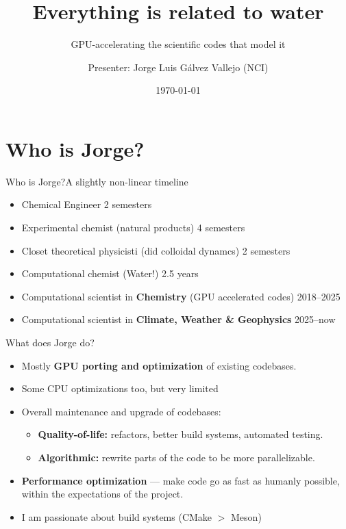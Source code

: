 \documentclass[aspectratio=169]{beamer}
\title[Water on GPUs]{Everything is related to water}
\subtitle{GPU-accelerating the scientific codes that model it}
\author[NOAA-GFDL \textperiodcentered\ ACCESS-NRI \textperiodcentered\ NCI]{Presenter: Jorge Luis Gálvez Vallejo \textnormal{(NCI)}\\[.25em]
  }
\institute{NCI \textperiodcentered\ ACCESS-NRI}
\date{\today}
\newcommand{\cplx}[1]{{\footnotesize\color{cookieMuted}#1}}
\begin{document}
\maketitle

\section{Who is Jorge?}

\begin{frame}{Who is Jorge?}{A slightly non-linear timeline}
  \begin{itemize}\setlength\itemsep{2pt}
    \item Chemical Engineer \hfill \cplx{2 semesters}
    \item Experimental chemist (natural products) \hfill \cplx{4 semesters}
    \item Closet theoretical physicisti (did colloidal dynamcs) \hfill \cplx{2 semesters}
    \item Computational chemist (Water!) \hfill \cplx{2.5 years}
    \item Computational scientist in \textbf{Chemistry} (GPU accelerated codes) \hfill \cplx{2018--2025}
    \item Computational scientist in \textbf{Climate, Weather \& Geophysics} \hfill \cplx{2025--now}
  \end{itemize}
\end{frame}

\begin{frame}{What does Jorge do?}
  \begin{itemize}
    \item Mostly \textbf{GPU porting and optimization} of existing codebases.
    \item Some CPU optimizations too, but very limited
    \item Overall maintenance and upgrade of codebases:
      \begin{itemize}
        \item \textbf{Quality-of-life:} refactors, better build systems, automated testing.
        \item \textbf{Algorithmic:} rewrite parts of the code to be more parallelizable.
      \end{itemize}
    \item \textbf{Performance optimization} --- make code go as fast as humanly possible, within the expectations of the project.
    \item I am passionate about build systems (CMake $>$ Meson)
  \end{itemize}
\end{frame}
\end{document}
